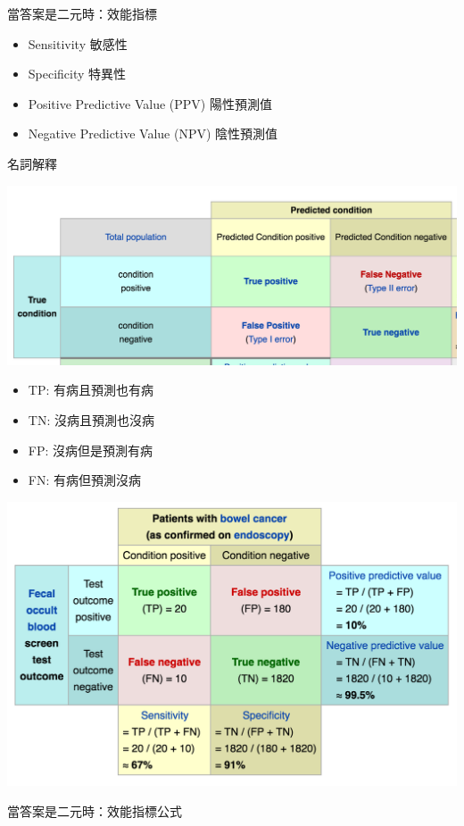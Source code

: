 \documentclass[
]{book}
\providecommand{\tightlist}{%
  \setlength{\itemsep}{0pt}\setlength{\parskip}{0pt}}
\begin{document}
當答案是二元時：效能指標

\begin{itemize}
\tightlist
\item
  Sensitivity 敏感性
\item
  Specificity 特異性
\item
  Positive Predictive Value (PPV) 陽性預測值
\item
  Negative Predictive Value (NPV) 陰性預測值
\end{itemize}

名詞解釋

\includegraphics[width=20in]{figure/Cond}

\begin{itemize}
\tightlist
\item
  TP: 有病且預測也有病
\item
  TN: 沒病且預測也沒病
\item
  FP: 沒病但是預測有病
\item
  FN: 有病但預測沒病
\end{itemize}

\includegraphics[width=16.61in]{figure/para}

當答案是二元時：效能指標公式
\end{document}
